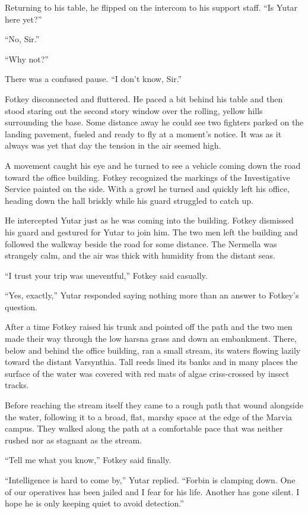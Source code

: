 Returning to his table, he flipped on the intercom to his support staff. ``Is Yutar here yet?''

``No, Sir.''

``Why not?''

There was a confused pause. ``I don't know, Sir.''

Fotkey disconnected and fluttered. He paced a bit behind his table and then stood staring out
the second story window over the rolling, yellow hills surrounding the base. Some distance away
he could see two fighters parked on the landing pavement, fueled and ready to fly at a moment's
notice. It was as it always was yet that day the tension in the air seemed high.

A movement caught his eye and he turned to see a vehicle coming down the road toward the office
building. Fotkey recognized the markings of the Investigative Service painted on the side. With
a growl he turned and quickly left his office, heading down the hall briskly while his guard
struggled to catch up.

He intercepted Yutar just as he was coming into the building. Fotkey dismissed his guard and
gestured for Yutar to join him. The two men left the building and followed the walkway beside
the road for some distance. The Nermella was strangely calm, and the air was thick with humidity
from the distant seas.

``I trust your trip was uneventful,'' Fotkey said casually.

``Yes, exactly,'' Yutar responded saying nothing more than an answer to Fotkey's question.

After a time Fotkey raised his trunk and pointed off the path and the two men made their way
through the low harsna grass and down an embankment. There, below and behind the office
building, ran a small stream, its waters flowing lazily toward the distant Varsynthia. Tall
reeds lined its banks and in many places the surface of the water was covered with red mats of
algae criss-crossed by insect tracks.

Before reaching the stream itself they came to a rough path that wound alongside the water,
following it to a broad, flat, marshy space at the edge of the Marvia campus. They walked along
the path at a comfortable pace that was neither rushed nor as stagnant as the stream.

``Tell me what you know,'' Fotkey said finally.

``Intelligence is hard to come by,'' Yutar replied. ``Forbin is clamping down. One of our
operatives has been jailed and I fear for his life. Another has gone silent. I hope he is only
keeping quiet to avoid detection.''

